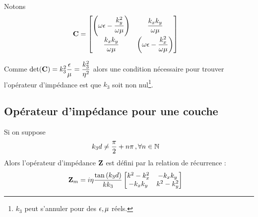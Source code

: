     Notons
    \begin{align}
        \mC &=
        \begin{bmatrix}
            \left(\w\eps-\frac{k_y^2}{\w\mu}\right) & \frac{k_xk_y}{\w\mu}\\
            \frac{k_xk_y}{\w\mu} & \left(\w\eps-\frac{k_x^2}{\w\mu}\right)
        \end{bmatrix}
    \end{align}

    Comme $\det(\mC) = k_3^2\frac{\eps}{\mu}=\frac{k_3^2}{\eta^2}$ alors une condition nécessaire pour trouver l'opérateur d'impédance est que $k_3$ soit non nul\footnote{$k_3$ peut s'annuler pour des $\eps,\mu$ réels.}.





    \subsection{Opérateur d'impédance pour une couche}

        \begin{figure}[h!]
        \centering
        \begin{tikzpicture}
        
        \end{tikzpicture}
        \end{figure}

        \begin{thm}
            Si on suppose
                \begin{align}
                k_3d &\not = \frac{\pi}{2}+n\pi\,, \forall n \in \NN
            \end{align}
            Alors l'opérateur d'impédance $\mZ$ est défini par la relation de récurrence : 
            \begin{align}
            \mZ_m &= i\eta\frac{\tan\left(k_3d\right)}{kk_3}
                \begin{bmatrix}
                   k^2-k_x^2  & -k_xk_y\\
                    -k_xk_y & k^2-k_y^2\\
                \end{bmatrix}
            \end{align}
        \end{thm}

